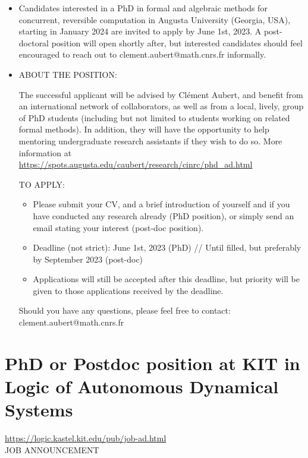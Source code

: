 \documentclass[prodmode,acmtecs]{acmsmall} %
\begin{document}
\begin{itemize}\item  Candidates interested in a PhD in formal and algebraic methods for concurrent, reversible computation in Augusta University (Georgia, USA), starting in January 2024 are invited to apply by June 1st, 2023. A post-doctoral position will open shortly after, but interested candidates should feel encouraged to reach out to clement.aubert@math.cnrs.fr informally. 
 
\item  ABOUT THE POSITION: 
 
  The successful applicant will be advised by Clément Aubert, and benefit from an international network of collaborators, as well as from a local, lively, group of PhD students (including but not limited to students working on related formal methods). In addition, they will have the opportunity to help mentoring undergraduate research assistants if they wish to do so. More information at \href{https://spots.augusta.edu/caubert/research/cinrc/phd_ad.html}{https://spots.augusta.edu/caubert/research/cinrc/phd\_ad.html} 
 
  TO APPLY: 
 
\begin{itemize}\item  Please submit your CV, and a brief introduction of yourself and if you have conducted any research already (PhD position), or simply send an email stating your interest (post-doc position).
\item  Deadline (not strict): June 1st, 2023 (PhD) // Until filled, but preferably by September 2023 (post-doc)
\item  Applications will still be accepted after this deadline, but priority will be given to those applications received by the deadline.
\end{itemize} 
  Should you have any questions, please feel free to contact: clement.aubert@math.cnrs.fr 
 
\end{itemize}\section{PhD or Postdoc position at KIT in Logic of Autonomous Dynamical Systems}\label{PhDorPostdocpositionatKITinLogicofAutonomousDynamicalSystems}  \href{https://logic.kastel.kit.edu/pub/job-ad.html}{https://logic.kastel.kit.edu/pub/job-ad.html}\\ 
JOB ANNOUNCEMENT 
\end{document}
